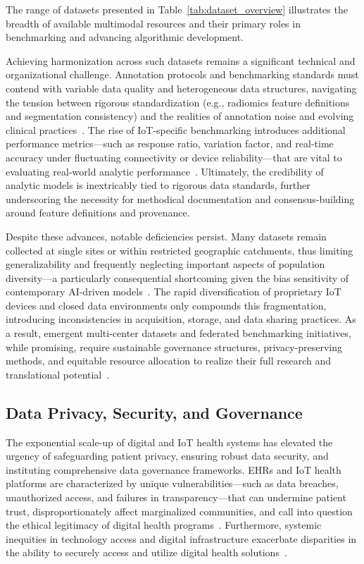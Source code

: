 \documentclass[sigconf]{acmart}
\begin{document}
The range of datasets presented in Table~\ref{tab:dataset_overview} illustrates the breadth of available multimodal resources and their primary roles in benchmarking and advancing algorithmic development.

Achieving harmonization across such datasets remains a significant technical and organizational challenge. Annotation protocols and benchmarking standards must contend with variable data quality and heterogeneous data structures, navigating the tension between rigorous standardization (e.g., radiomics feature definitions and segmentation consistency) and the realities of annotation noise and evolving clinical practices~\cite{ref44,ref45,ref46,ref50,ref54,ref55,ref60,ref61,ref62,ref63,ref64,ref65,ref66,ref67,ref82,ref83,ref84,ref89,ref90,ref106}. The rise of IoT-specific benchmarking introduces additional performance metrics---such as response ratio, variation factor, and real-time accuracy under fluctuating connectivity or device reliability---that are vital to evaluating real-world analytic performance~\cite{ref84,ref106}. Ultimately, the credibility of analytic models is inextricably tied to rigorous data standards, further underscoring the necessity for methodical documentation and consensus-building around feature definitions and provenance.

Despite these advances, notable deficiencies persist. Many datasets remain collected at single sites or within restricted geographic catchments, thus limiting generalizability and frequently neglecting important aspects of population diversity---a particularly consequential shortcoming given the bias sensitivity of contemporary AI-driven models~\cite{ref43,ref75,ref106}. The rapid diversification of proprietary IoT devices and closed data environments only compounds this fragmentation, introducing inconsistencies in acquisition, storage, and data sharing practices. As a result, emergent multi-center datasets and federated benchmarking initiatives, while promising, require sustainable governance structures, privacy-preserving methods, and equitable resource allocation to realize their full research and translational potential~\cite{ref84,ref106}.

\subsection{Data Privacy, Security, and Governance}

The exponential scale-up of digital and IoT health systems has elevated the urgency of safeguarding patient privacy, ensuring robust data security, and instituting comprehensive data governance frameworks. EHRs and IoT health platforms are characterized by unique vulnerabilities—such as data breaches, unauthorized access, and failures in transparency—that can undermine patient trust, disproportionately affect marginalized communities, and call into question the ethical legitimacy of digital health programs~\cite{ref2,ref6,ref7,ref8,ref9,ref10,ref24,ref25,ref28,ref30,ref46,ref50,ref51,ref61,ref63,ref64,ref70,ref82,ref83,ref84,ref106}. Furthermore, systemic inequities in technology access and digital infrastructure exacerbate disparities in the ability to securely access and utilize digital health solutions~\cite{ref84,ref106}.
\end{document}
